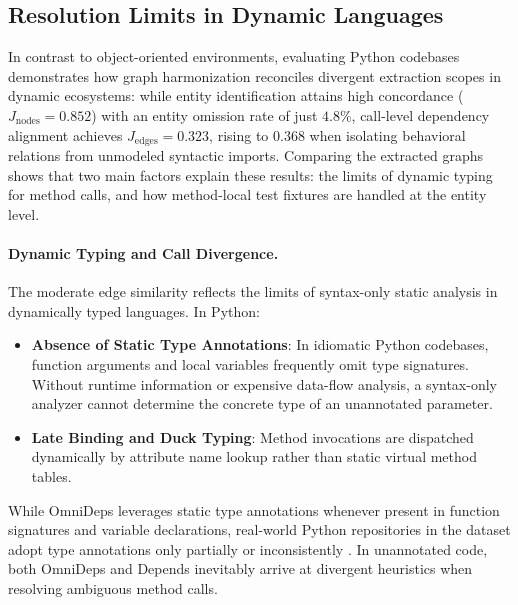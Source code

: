 \subsection{Resolution Limits in Dynamic Languages}
\label{subsec:discussion_dynamic_languages}

In contrast to object-oriented environments, evaluating Python codebases
dem\-on\-strates how graph harmonization reconciles divergent extraction scopes
in dynamic ecosystems: while entity identification attains high concordance
($J_{\text{nodes}} = 0.852$) with an entity omission rate of just $4.8\%$,
call-level dependency alignment achieves $J_{\text{edges}} = 0.323$, rising to
$0.368$ when isolating behavioral relations from unmodeled syntactic imports.
Comparing the extracted graphs shows that two main factors explain these
results: the limits of dynamic typing for method calls, and how method-local
test fixtures are handled at the entity level.

\paragraph{Dynamic Typing and Call Divergence.}
The moderate edge similarity reflects the limits of syntax-only static
analysis in dynamically typed languages. In Python:
\begin{itemize}
  \item \textbf{Absence of Static Type Annotations}: In idiomatic Python
    codebases, function arguments and local variables frequently omit type
    signatures. Without runtime information or expensive data-flow analysis,
    a syntax-only analyzer cannot determine the concrete type of an
    unannotated parameter.
  \item \textbf{Late Binding and Duck Typing}: Method invocations are
    dispatched dynamically by attribute name lookup rather than static virtual
    method tables.
\end{itemize}
While OmniDeps leverages static type annotations \cite{pep484} whenever present
in function signatures and variable declarations, real-world Python
repositories in the dataset adopt type annotations only partially or
inconsistently \cite{magalhaes_understanding_2026}. In unannotated
code, both OmniDeps and Depends inevitably arrive at divergent
heuristics when resolving ambiguous method calls.

